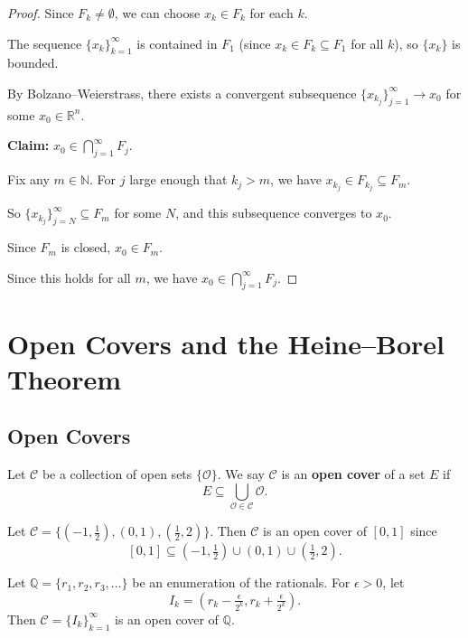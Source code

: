 \documentclass[11pt]{report}
\begin{document}
\begin{proof}
Since $F_k \neq \emptyset$, we can choose $x_k \in F_k$ for each $k$.

The sequence $\{x_k\}_{k=1}^\infty$ is contained in $F_1$ (since $x_k \in F_k \subseteq F_1$ for all $k$), so $\{x_k\}$ is bounded.

By Bolzano--Weierstrass, there exists a convergent subsequence $\{x_{k_j}\}_{j=1}^\infty \to x_0$ for some $x_0 \in \mathbb{R}^n$.

\textbf{Claim:} $x_0 \in \bigcap_{j=1}^\infty F_j$.

Fix any $m \in \mathbb{N}$. For $j$ large enough that $k_j > m$, we have $x_{k_j} \in F_{k_j} \subseteq F_m$.

So $\{x_{k_j}\}_{j=N}^\infty \subseteq F_m$ for some $N$, and this subsequence converges to $x_0$.

Since $F_m$ is closed, $x_0 \in F_m$.

Since this holds for all $m$, we have $x_0 \in \bigcap_{j=1}^\infty F_j$.
\end{proof}

\section{Open Covers and the Heine--Borel Theorem}

\subsection{Open Covers}

\begin{defbox}
Let $\mathcal{C}$ be a collection of open sets $\{\mathcal{O}\}$. We say $\mathcal{C}$ is an \textbf{open cover} of a set $E$ if
\[
E \subseteq \bigcup_{\mathcal{O} \in \mathcal{C}} \mathcal{O}.
\]
\end{defbox}

\begin{exbox}
Let $\mathcal{C} = \{(-1, \frac{1}{2}), (0, 1), (\frac{1}{2}, 2)\}$. Then $\mathcal{C}$ is an open cover of $[0,1]$ since
\[
[0,1] \subseteq (-1, \tfrac{1}{2}) \cup (0, 1) \cup (\tfrac{1}{2}, 2).
\]
\end{exbox}

\begin{exbox}
Let $\mathbb{Q} = \{r_1, r_2, r_3, \ldots\}$ be an enumeration of the rationals. For $\epsilon > 0$, let
\[
I_k = (r_k - \tfrac{\epsilon}{2^k}, r_k + \tfrac{\epsilon}{2^k}).
\]
Then $\mathcal{C} = \{I_k\}_{k=1}^\infty$ is an open cover of $\mathbb{Q}$.
\end{exbox}
\end{document}
